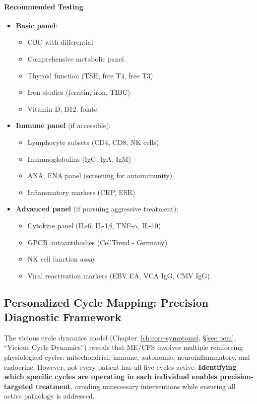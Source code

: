 \paragraph{Recommended Testing}
\begin{itemize}
    \item \textbf{Basic panel}:
    \begin{itemize}
        \item CBC with differential
        \item Comprehensive metabolic panel
        \item Thyroid function (TSH, free T4, free T3)
        \item Iron studies (ferritin, iron, TIBC)
        \item Vitamin D, B12, folate
    \end{itemize}

    \item \textbf{Immune panel} (if accessible):
    \begin{itemize}
        \item Lymphocyte subsets (CD4, CD8, NK cells)
        \item Immunoglobulins (IgG, IgA, IgM)
        \item ANA, ENA panel (screening for autoimmunity)
        \item Inflammatory markers (CRP, ESR)
    \end{itemize}

    \item \textbf{Advanced panel} (if pursuing aggressive treatment):
    \begin{itemize}
        \item Cytokine panel (IL-6, IL-1$\beta$, TNF-$\alpha$, IL-10)
        \item GPCR autoantibodies (CellTrend - Germany)
        \item NK cell function assay
        \item Viral reactivation markers (EBV EA, VCA IgG, CMV IgG)
    \end{itemize}
\end{itemize}

\subsection{Personalized Cycle Mapping: Precision Diagnostic Framework}
\label{subsec:cycle-mapping}

The vicious cycle dynamics model (Chapter~\ref{ch:core-symptoms}, \S\ref{sec:pem}, ``Vicious Cycle Dynamics'') reveals that ME/CFS involves multiple reinforcing physiological cycles: mitochondrial, immune, autonomic, neuroinflammatory, and endocrine. However, not every patient has all five cycles active. \textbf{Identifying which specific cycles are operating in each individual enables precision-targeted treatment}, avoiding unnecessary interventions while ensuring all active pathology is addressed.


